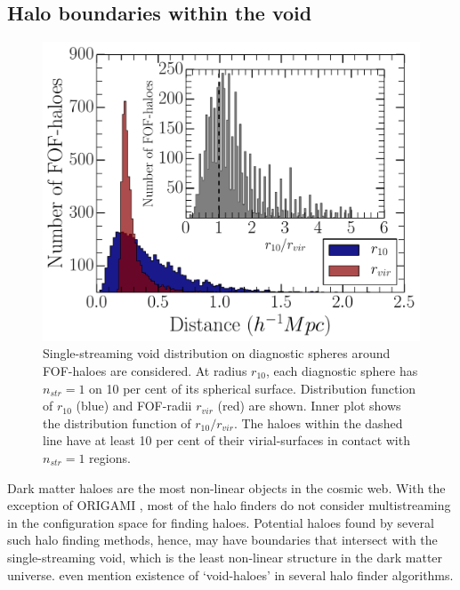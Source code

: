  
\subsection{Halo boundaries within the void}
\label{sec:voidHaloes}

\begin{figure}
\begin{minipage}[t]{.99\linewidth}
\centering\includegraphics[width=10.cm]{Chapter4/Source_v2/fig3.pdf} 
\end{minipage}\hfill
\caption{Single-streaming void distribution on diagnostic spheres around FOF-haloes are considered. At radius $r_{10}$, each diagnostic sphere has $n_{str} = 1$ on 10 per cent of its spherical surface. Distribution function of $r_{10}$ (blue) and FOF-radii $r_{vir}$ (red) are shown. Inner plot shows the distribution function of $r_{10}/r_{vir}$. The haloes within the dashed line have at least 10 per cent of their virial-surfaces in contact with $n_{str} = 1$ regions.}
\label{fig:Vfr_all}
\end{figure}


Dark matter haloes are the most non-linear objects in the cosmic web. With the exception of ORIGAMI \citep{Falck2012}, most of the halo finders do not consider multistreaming in the configuration space for finding haloes. Potential haloes found by several such halo finding methods, hence, may have boundaries that intersect with the single-streaming void, which is the least non-linear structure in the dark matter universe. \cite{Colberg2008} even mention existence of `void-haloes' in several halo finder algorithms.  

